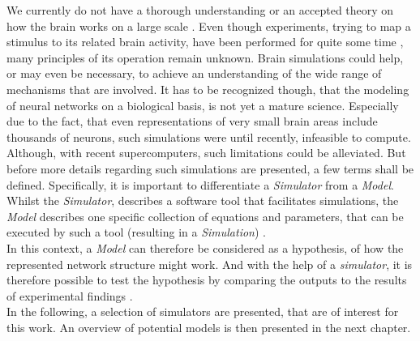     We currently do not have a thorough understanding or an accepted theory on how the brain works on a large scale \cite{Einevoll.2019}. Even though experiments, trying to map a stimulus to its related brain activity, have been performed for quite some time \cite{Hubel.1959}, many principles of its operation remain unknown.
    Brain simulations could help, or may even be necessary, to achieve an understanding of the wide range of mechanisms that are involved. It has to be recognized though, that the modeling of neural networks on a biological basis, is not yet a mature science. Especially due to the fact, that even representations of very small brain areas include thousands of neurons, such simulations were until recently, infeasible to compute. Although, with recent supercomputers, such limitations could be alleviated.
    But before more details regarding such simulations are presented, a few terms shall be defined. Specifically, it is important to differentiate a \textit{Simulator} from a \textit{Model}. Whilst the \textit{Simulator}, describes a software tool that facilitates simulations, the \textit{Model} describes one specific collection of equations and parameters, that can be executed by such a tool (resulting in a \textit{Simulation}) \cite{Einevoll.2019}.\\
    In this context, a \textit{Model} can therefore be considered as a hypothesis, of how the represented network structure might work. And with the help of a \textit{simulator}, it is therefore possible to test the hypothesis by comparing the outputs to the results of experimental findings \cite{Einevoll.2019}.\\
    In the following, a selection of simulators are presented, that are of interest for this work. An overview of potential models is then presented in the next chapter. 
        
    
